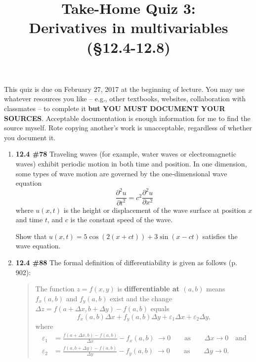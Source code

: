 \documentclass[%
]{article}
\title{\vspace{-3.5pc} 
	\flushleft \bf \Large Take-Home Quiz 3: \\ Derivatives in multivariables (\S 12.4-12.8)}
\date{}
\begin{document}
\maketitle

\vspace{-3pc}
 This quiz is due on February 27, 2017 at the beginning of lecture.  You may use whatever resources you like -- e.g., other textbooks, websites, collaboration with classmates -- to complete it \textbf{but YOU MUST DOCUMENT YOUR SOURCES}.  Acceptable documentation is enough information for me to find the source myself.  Rote copying another's work is unacceptable, regardless of whether you document it.  

\noindent\hrulefill

\begin{enumerate}
\item {\bf 12.4 \#78} 
Traveling waves (for example, water waves or electromagnetic waves) exhibit periodic motion in both time and position.  In one dimension, some types of wave motion are governed by the one-dimensional wave equation
\[
\frac{\partial^2u}{\partial t^2}=c^2\frac{\partial^2u}{\partial x^2}
\]
where $u(x,t)$ is the height or displacement of the wave surface at position $x$ and time $t$, and $c$ is the constant speed of the wave. 

Show that $u(x,t)=5\cos(2(x+ct))+3\sin(x-ct)$ satisfies the wave equation.

\vspace{1pc}
\item {\bf 12.4 \#88}
The formal definition of differentiability is given as follows (p. 902):

\begin{quote}
\hrulefill

The function $z=f(x,y)$ is \textbf{differentiable at $(a,b)$} means $f_x(a,b)$ and $f_y(a,b)$ exist and the change $\Delta z=f(a+\Delta x,b+\Delta y)-f(a,b)$ equals
\[
f_x(a,b)\Delta x+f_y(a,b)\Delta y+\varepsilon_1\Delta x+\varepsilon_2\Delta y,
\]
where 
\begin{align*}
\varepsilon_1 &= \frac{f(a+\Delta x,b)-f(a,b)}{\Delta x}-f_x(a,b)\; \longrightarrow 0\qquad\text{as}\qquad \Delta x\to 0 \quad\text{and}\\
\varepsilon_2 &= \frac{f(a,b+\Delta y)-f(a,b)}{\Delta y}-f_y(a,b)\; \longrightarrow 0\qquad\text{as}\qquad \Delta y\to 0.
\end{align*}
\hrulefill
\end{quote}


\end{enumerate}
\end{document}
